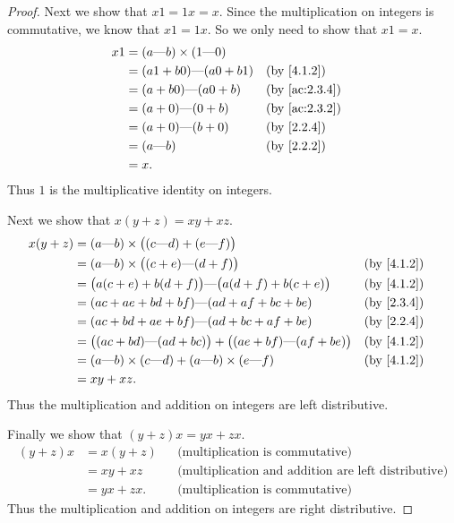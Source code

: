\begin{proof}
  Next we show that \(x1 = 1x = x\).
  Since the multiplication on integers is commutative, we know that \(x1 = 1x\).
  So we only need to show that \(x1 = x\).
  \begin{align*}
    x1 & = (a \text{---} b) \times (1 \text{---} 0)                    \\
       & = (a1 + b0) \text{---} (a0 + b1)           &  & \by{4.1.2}    \\
       & = (a + b0) \text{---} (a0 + b)             &  & \by{ac:2.3.4} \\
       & = (a + 0) \text{---} (0 + b)               &  & \by{ac:2.3.2} \\
       & = (a + 0) \text{---} (b + 0)               &  & \by{2.2.4}    \\
       & = (a \text{---} b)                         &  & \by{2.2.2}    \\
       & = x.
  \end{align*}
  Thus \(1\) is the multiplicative identity on integers.

  Next we show that \(x(y + z) = xy + xz\).
  \begin{align*}
    x(y + z) & = (a \text{---} b) \times \big((c \text{---} d) + (e \text{---} f)\big)                               \\
             & = (a \text{---} b) \times \big((c + e) \text{---} (d + f)\big)                        &  & \by{4.1.2} \\
             & = \big(a(c + e) + b(d + f)\big) \text{---} \big(a(d + f) + b(c + e)\big)              &  & \by{4.1.2} \\
             & = (ac + ae + bd + bf) \text{---} (ad + af + bc + be)                                  &  & \by{2.3.4} \\
             & = (ac + bd + ae + bf) \text{---} (ad + bc + af + be)                                  &  & \by{2.2.4} \\
             & = \big((ac + bd) \text{---} (ad + bc)\big) + \big((ae + bf) \text{---} (af + be)\big) &  & \by{4.1.2} \\
             & = (a \text{---} b) \times (c \text{---} d) + (a \text{---} b) \times (e \text{---} f) &  & \by{4.1.2} \\
             & = xy + xz.
  \end{align*}
  Thus the multiplication and addition on integers are left distributive.

  Finally we show that \((y + z)x = yx + zx\).
  \begin{align*}
    (y + z)x & = x(y + z) &  & \text{(multiplication is commutative)}                     \\
             & = xy + xz  &  & \text{(multiplication and addition are left distributive)} \\
             & = yx + zx. &  & \text{(multiplication is commutative)}
  \end{align*}
  Thus the multiplication and addition on integers are right distributive.
\end{proof}

